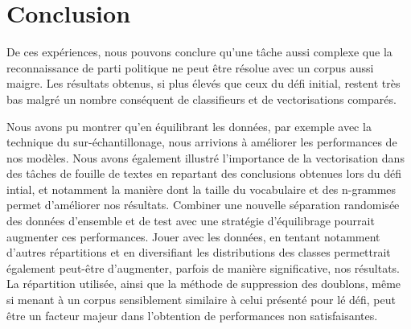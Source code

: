 \documentclass[11pt]{article}
\begin{document}
\section{Conclusion}

De ces expériences, nous pouvons conclure qu'une tâche aussi complexe que la reconnaissance de parti politique ne peut être résolue avec un corpus aussi maigre. Les résultats obtenus, si plus élevés que ceux du défi initial, restent très bas malgré un nombre conséquent de classifieurs et de vectorisations comparés.


Nous avons pu montrer qu'en équilibrant les données, par exemple avec la technique du sur-échantillonage, nous arrivions à améliorer les performances de nos modèles. Nous avons également illustré l'importance de la vectorisation dans des tâches de fouille de textes en repartant des conclusions obtenues lors du défi intial, et notamment la manière dont la taille du vocabulaire et des n-grammes permet d'améliorer nos résultats. Combiner une nouvelle séparation randomisée des données d'ensemble et de test avec une stratégie d'équilibrage pourrait augmenter ces performances. Jouer avec les données, en tentant notamment d'autres répartitions et en diversifiant les distributions des classes permettrait également peut-être d'augmenter, parfois de manière significative, nos résultats. La répartition utilisée, ainsi que la méthode de suppression des doublons, même si menant à un corpus sensiblement similaire à celui présenté pour lé défi, peut être un facteur majeur dans l'obtention de performances non satisfaisantes.



\end{document}
